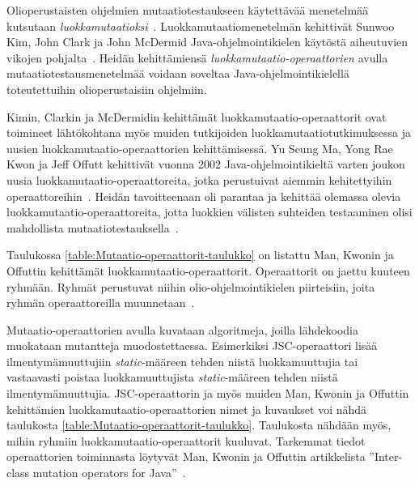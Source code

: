 \documentclass[finnish, grading]{tktltiki2}
\theoremstyle{definition}
\theoremstyle{remark}
\begin{document}
Olioperustaisten ohjelmien mutaatiotestaukseen käytettävää menetelmää kutsutaan \textit{luokkamutaatioksi}~\cite{Kim:Clark:McDermid:2000}. Luokkamutaatiomenetelmän kehittivät Sunwoo Kim, John Clark ja John McDermid Java-oh\-jel\-moin\-ti\-kie\-len käytöstä aiheutuvien vikojen pohjalta~\cite{Kim:Clark:McDermid:2000}. Heidän kehittämiensä \textit{luokkamutaatio-operaattorien} avulla mutaatiotestausmenetelmää voidaan soveltaa Java-ohjelmointikielellä toteutettuihin olioperustaisiin ohjelmiin.

Kimin, Clarkin ja McDermidin kehittämät luokkamutaatio-operaattorit ovat toimineet lähtökohtana myös muiden tutkijoiden luokkamutaatiotutkimuksessa ja uusien luokkamutaatio-operaattorien kehittämisessä. Yu Seung Ma, Yong Rae Kwon ja Jeff Offutt kehittivät vuonna 2002 Java-oh\-jel\-moin\-ti\-kiel\-tä varten joukon uusia luokkamutaatio-operaattoreita, jotka perustuivat aiemmin kehitettyihin operaattoreihin~\cite[s. 352]{Ma:Kwon:Offutt:2002}. Heidän tavoitteenaan oli parantaa ja kehittää olemassa olevia luokkamutaatio-operaattoreita, jotta luokkien välisten suhteiden testaaminen olisi mahdollista mutaatiotestauksella~\cite[s. 362]{Ma:Kwon:Offutt:2002}.

Taulukossa \ref{table:Mutaatio-operaattorit-taulukko} on listattu Man, Kwonin ja Offuttin kehittämät luok\-ka\-mu\-taa\-ti\-o-o\-pe\-raat\-to\-rit. Operaattorit on jaettu kuuteen ryhmään. Ryhmät perustuvat niihin olio-ohjelmointikielen piirteisiin, joita ryhmän operaattoreilla muunnetaan~\cite[s. 355]{Ma:Kwon:Offutt:2002}.

Mutaatio-operaattorien avulla kuvataan algoritmeja, joilla lähdekoodia muokataan mutantteja muodostettaessa. Esimerkiksi JSC-operaattori lisää ilmentymämuuttujiin \textit{static}-määreen tehden niistä luokkamuuttujia tai vastaavasti poistaa luokkamuuttujista \textit{static}-määreen tehden niistä ilmentymämuuttujia. JSC-operaattorin ja myös muiden Man, Kwonin ja Offuttin kehittämien luokkamutaatio-operaattorien nimet ja kuvaukset voi nähdä taulukosta \ref{table:Mutaatio-operaattorit-taulukko}. Taulukosta nähdään myös, mihin ryhmiin luokkamutaatio-operaattorit kuuluvat. Tarkemmat tiedot operaattorien toiminnasta löytyvät Man, Kwonin ja Offuttin artikkelista ''Inter-class mutation operators for Java''~\cite{Ma:Kwon:Offutt:2002}. 
\end{document}
